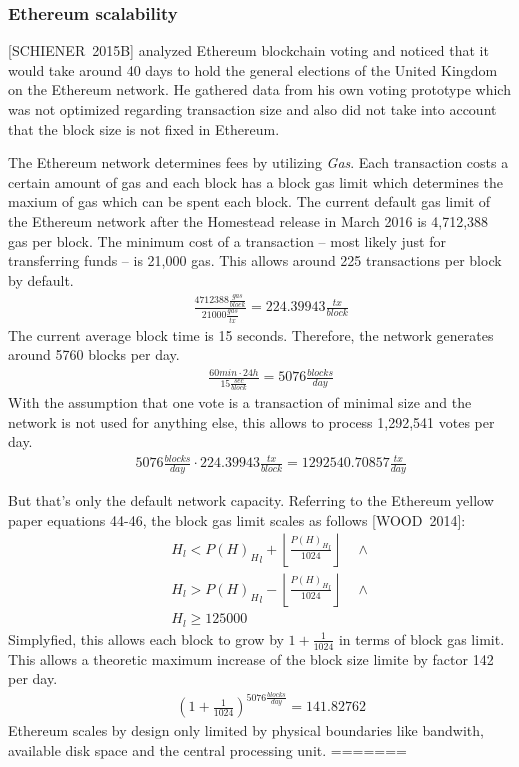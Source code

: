 \documentclass[9pt,oneside]{amsart}
\begin{document}
\begin{multicols}{2}
\subsubsection{Ethereum scalability}
[SCHIENER~2015B] analyzed Ethereum blockchain voting and noticed that it would take around 40 days to hold the general elections of the United Kingdom on the Ethereum network. He gathered data from his own voting prototype which was not optimized regarding transaction size and also did not take into account that the block size is not fixed in Ethereum.\par
The Ethereum network determines fees by utilizing \textit{Gas}. Each transaction costs a certain amount of gas and each block has a block gas limit which determines the maxium of gas which can be spent each block. The current default gas limit of the Ethereum network after the Homestead release in March 2016 is 4,712,388 gas per block. The minimum cost of a transaction -- most likely just for transferring funds -- is 21,000 gas. This allows around 225 transactions per block by default.
\begin{eqnarray}
& & \frac {4712388 \frac{gas}{block}}{21000\frac{gas}{tx}} = 224.39943 \frac{tx}{block}
\end{eqnarray}
The current average block time is 15 seconds. Therefore, the network generates around 5760 blocks per day.
\begin{eqnarray}
& & \frac{60 min \cdot 24 h}{15 \frac{sec}{block}} = 5076 \frac {blocks}{day}
\end{eqnarray}
With the assumption that one vote is a transaction of minimal size and the network is not used for anything else, this allows to process 1,292,541 votes per day.
\begin{eqnarray}
& & 5076 \frac {blocks}{day} \cdot 224.39943 \frac {tx} {block} = 1292540.70857 \frac{tx}{day}
\end{eqnarray}\par
But that's only the default network capacity. Referring to the Ethereum yellow paper equations 44-46, the block gas limit scales as follows [WOOD~2014]:
\begin{eqnarray}
& & H_l < {P(H)_H}_l + \left\lfloor\frac{{P(H)_H}_l}{1024}\right\rfloor \quad \wedge \\ %
& & H_l > {P(H)_H}_l - \left\lfloor\frac{{P(H)_H}_l}{1024}\right\rfloor \quad \wedge \\ %
& & H_l \geqslant 125000 %
\end{eqnarray}
Simplyfied, this allows each block to grow by $1 + \frac{1}{1024}$ in terms of block gas limit. This allows a theoretic maximum increase of the block size limite by factor 142 per day.
\begin{eqnarray}
& & \left( 1 + \frac{1}{1024} \right) ^ {5076 \frac {blocks}{day}} = 141.82762
\end{eqnarray}
Ethereum scales by design only limited by physical boundaries like bandwith, available disk space and the central processing unit.
=======


\end{multicols}
\end{document}
